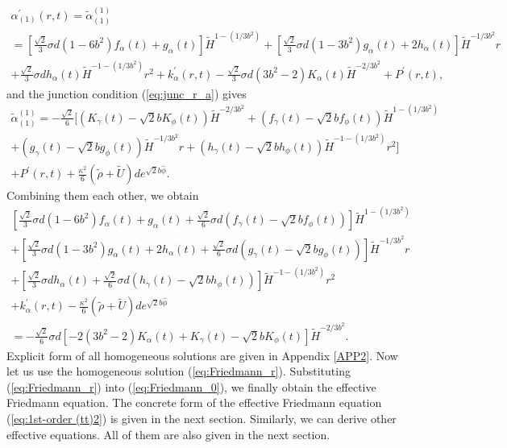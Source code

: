 \documentclass[a4paper,11pt]{article}
\begin{document}
\begin{multline}
\alpha_{(1)}^{\prime}(r,t) = \tilde{\alpha}_{(1)}^{(1)} \\
=\left[
\frac{\sqrt{2}}{3}\sigma d (1-6b^2)f_{\alpha}(t)+g_{\alpha}(t)
\right] \tilde{H}^{1-(1/3b^2)} 
+\left[
\frac{\sqrt{2}}{3}\sigma d (1-3b^2)g_{\alpha}(t)+2h_{\alpha}(t)
\right] \tilde{H}^{-1/3b^2} r \\
+\frac{\sqrt{2}}{3}\sigma d h_{\alpha}(t) 
\tilde{H}^{-1-(1/3b^2)} r^2 
+k_{\alpha}^{\prime}(r,t) 
-\frac{\sqrt{2}}{3}\sigma d (3b^2 -2)K_{\alpha}(t)  \tilde{H}^{-2/3b^2} 
+P^{\prime}(r,t),  
\end{multline} 
and the junction condition (\ref{eq:junc_r_a}) gives 
\begin{multline}
\tilde{\alpha}_{(1)}^{(1)} = 
-\frac{\sqrt{2}}{6}
[
(K_{\gamma}(t)-\sqrt{2}b K_{\phi}(t))\tilde{H}^{-2/3b^2} 
+(f_{\gamma}(t)-\sqrt{2}b f_{\phi}(t))\tilde{H}^{1-(1/3b^2)} \\
+(g_{\gamma}(t)-\sqrt{2}b g_{\phi}(t))\tilde{H}^{-1/3b^2} r 
+(h_{\gamma}(t)-\sqrt{2}b h_{\phi}(t))\tilde{H}^{-1-(1/3b^2)} r^2   
] \\
+P^{\prime}(r,t) 
+\frac{\kappa^2}{6}(\tilde{\rho}+\tilde{U})d e^{\sqrt{2}b \hat{\phi}}. 
\end{multline} 
Combining them each other, we obtain 
\begin{multline}
\left[
\frac{\sqrt{2}}{3}\sigma d (1-6b^2)f_{\alpha}(t) +g_{\alpha}(t)
+\frac{\sqrt{2}}{6}\sigma d (f_{\gamma}(t)-\sqrt{2}b f_{\phi}(t))
\right]\tilde{H}^{1-(1/3b^2)} \\
+\left[
\frac{\sqrt{2}}{3}\sigma d (1-3b^2)g_{\alpha}(t) + 2h_{\alpha}(t)
+\frac{\sqrt{2}}{6}\sigma d (g_{\gamma}(t)-\sqrt{2}b g_{\phi}(t))
\right]\tilde{H}^{-1/3b^2} r \mbox{ }\hspace{2cm} \\ 
+\left[
\frac{\sqrt{2}}{3}\sigma d h_{\alpha}(t)
+\frac{\sqrt{2}}{6}\sigma d (h_{\gamma}(t)-\sqrt{2}b h_{\phi}(t))
\right]\tilde{H}^{-1-(1/3b^2)} r^2  \\
+k_{\alpha}^{\prime}(r,t) 
-\frac{\kappa^2}{6}(\tilde{\rho}+\tilde{U})d e^{\sqrt{2}b\hat{\phi}} \\
=-\frac{\sqrt{2}}{6}\sigma d
[
-2(3b^2 -2)K_{\alpha}(t)+K_{\gamma}(t)-\sqrt{2}b K_{\phi}(t)
]\tilde{H}^{-2/3b^2}. 
\label{eq:Friedmann_r}
\end{multline}
Explicit form of all homogeneous solutions are given in Appendix
\ref{APP2}.  
Now let us use the homogeneous solution (\ref{eq:Friedmann_r}).  
Substituting (\ref{eq:Friedmann_r}) into 
(\ref{eq:Friedmann_0}), we finally obtain the effective Friedmann
equation. The concrete form of the effective Friedmann equation 
(\ref{eq:1st-order (tt)2}) is given in the next section. 
Similarly, we can derive other effective equations. All of them 
are also given in the next section.  
\end{document}
